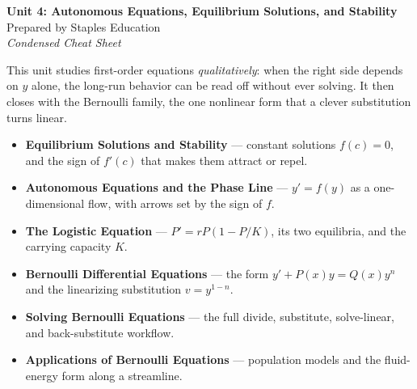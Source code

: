 




\begin{center}
    {\LARGE \bfseries Unit 4: Autonomous Equations, Equilibrium Solutions, and Stability}\\[6pt]
    {\large Prepared by Staples Education}\\[4pt]
    {\itshape Condensed Cheat Sheet}
\end{center}

\vspace{0.4em}

\begin{topicsbox}
This unit studies first-order equations \emph{qualitatively}: when the right
side depends on $y$ alone, the long-run behavior can be read off without ever
solving. It then closes with the Bernoulli family, the one nonlinear form that a
clever substitution turns linear.
\begin{itemize}[leftmargin=1.4em, itemsep=3pt]
    \item \textbf{Equilibrium Solutions and Stability} --- constant solutions
          $f(c)=0$, and the sign of $f'(c)$ that makes them attract or repel.
    \item \textbf{Autonomous Equations and the Phase Line} --- $y'=f(y)$ as a
          one-dimensional flow, with arrows set by the sign of $f$.
    \item \textbf{The Logistic Equation} --- $P'=rP(1-P/K)$, its two equilibria,
          and the carrying capacity $K$.
    \item \textbf{Bernoulli Differential Equations} --- the form
          $y'+P(x)y=Q(x)y^{n}$ and the linearizing substitution $v=y^{1-n}$.
    \item \textbf{Solving Bernoulli Equations} --- the full divide, substitute,
          solve-linear, and back-substitute workflow.
    \item \textbf{Applications of Bernoulli Equations} --- population models and
          the fluid-energy form along a streamline.
\end{itemize}
\end{topicsbox}


